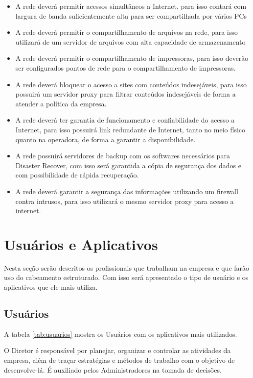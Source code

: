 \documentclass[	DIV=calc,%
							paper=a4,%
							fontsize=12pt,%
							onecolumn]{scrartcl}	 					%
\begin{document}
\begin{itemize}				
\item A rede deverá permitir acessos simultâneos a Internet, para isso contará com largura de banda suficientemente alta para ser compartilhada por vários PCs
\item A rede deverá permitir o compartilhamento de arquivos na rede, para isso utilizará de um servidor de arquivos com alta capacidade de armazenamento 
\item A rede deverá permitir o compartilhamento de impressoras, para isso deverão ser configurados pontos de rede para o compartilhamento de impressoras.		
\item A rede deverá bloquear o acesso a sites com conteúdos indesejáveis, para isso possuirá um servidor proxy para filtrar conteúdos indesejáveis de forma a atender a política da empresa.
\item A rede deverá ter garantia de funcionamento e confiabilidade do acesso a Internet, para isso possuirá link redundante de Internet, tanto no meio físico quanto na operadora, de forma a garantir a disponibilidade.
\item A rede possuirá servidores de backup com os softwares necessários para Disaster Recover, com isso será garantida a cópia de segurança dos dados e com possibilidade de rápida recuperação.
\item A rede deverá garantir a segurança das informações utilizando um firewall contra intrusos, para isso utilizará o mesmo servidor proxy para acesso a internet.
\end{itemize}

\section{Usuários e Aplicativos}
Nesta seção serão descritos os profissionais que trabalham na empresa e que farão uso do cabeamento estruturado. Com isso será apresentado o tipo de usuário e os aplicativos que ele mais utiliza. 

\subsection{Usuários}

A tabela \ref{tab:usuarios} mostra os Usuários com os aplicativos mais utilizados.



O Diretor é responsável por planejar, organizar e controlar as atividades da empresa, além de traçar estratégias e métodos de trabalho com o objetivo de desenvolve-lá. É auxiliado pelos Administradores na tomada de decisões. 
\end{document}

